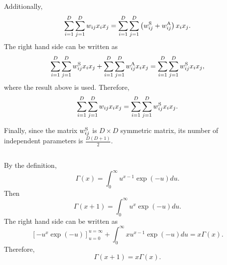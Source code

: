 Additionally,
%
\begin{equation}
\sum_{i = 1}^{D} \sum_{j = 1}^{D} w_{ij} x_i x_j = \sum_{i = 1}^{D} \sum_{j = 1}^{D} \left( w_{ij}^{\rm S} + w_{ij}^{\rm A} \right) x_i x_j.
\end{equation}
%
The right hand side can be written as
%
\begin{equation}
\sum_{i = 1}^{D} \sum_{j = 1}^{D} w_{ij}^{\rm S} x_i x_j + \sum_{i = 1}^{D} \sum_{j = 1}^{D} w_{ij}^{\rm A} x_i x_j = \sum_{i = 1}^{D} \sum_{j = 1}^{D} w_{ij}^{\rm S} x_i x_j,
\end{equation}
%
where the result above is used. 
Therefore,
%
\begin{equation}
\sum_{i = 1}^{D} \sum_{j = 1}^{D} w_{ij} x_i x_j = \sum_{i = 1}^{D} \sum_{j = 1}^{D} w_{ij}^{\rm S} x_i x_j.
\end{equation}
%

Finally, since the matrix $w_{ij}^{\rm S}$ is $D \times D$ symmetric matrix, its number of independent parameters is $\frac{D (D + 1)}{2}$.






\subsection{}
By the definition,
%
\begin{equation}
\Gamma(x) = \int_{0}^{\infty} u ^ {x - 1} \exp(- u) du.
\end{equation}
%
Then
%
\begin{equation}
\Gamma(x + 1) = \int_{0}^{\infty} u ^ {x} \exp(- u) du.
\end{equation}
%
The right hand side can be written as 
%
\begin{equation}
\left[ - u ^ x \exp(- u) \right]_{u = 0}^{u = \infty} + \int_{0}^{\infty} x u ^ {x - 1} \exp(- u) du = x \Gamma(x).
\end{equation}
%
Therefore,
%
\begin{equation}
\Gamma( x + 1) = x \Gamma(x).
\end{equation}
%

